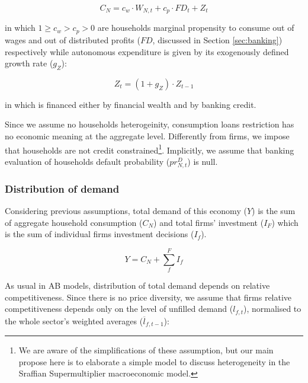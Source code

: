 \documentclass[12pt,openright,oneside,a4paper,english,sumario=tradicional]{gpsabntex}
\numberwithin{listing}{chapter}
\begin{document}
\begin{latex}
\begin{equation}
C_{N} = c_{w}\cdot W_{N,t} + c_{p}\cdot FD_{t} + Z_{t}
\end{equation}
\end{latex}
in which \(1 \geq c_{w} > c_{p} > 0\) are households marginal propensity to consume out of wages and out of distributed profits (\(FD\), discussed in Section \ref{sec:banking}) respectively while autonomous expenditure is given by its exogenously defined growth rate (\(g_{Z}\)):
\begin{latex}
\begin{equation}
Z_{t} = (1+g_{Z})\cdot Z_{t-1}
\end{equation}
\end{latex}
in which is financed either by financial wealth and by banking credit.

Since we assume no households heterogeinity, consumption loans restriction has no economic meaning at the aggregate level.
Differently from firms, we impose that households are not credit constrained\footnote{We are aware of the simplifications of these assumption, but our main propose here is to elaborate a simple model to discuss heterogeneity in the Sraffian Supermultiplier macroeconomic model.}.
Implicitly, we assume that banking evaluation of households default probability (\(pr^{D}_{N,t}\)) is null.

\subsubsection{Distribution of demand}
\label{sec:org506a775}


Considering previous assumptions, total demand of this economy (\(Y\)) is the sum of aggregate household consumption (\(C_{N}\)) and total firms' investment (\(I_{F}\)) which is the sum of individual firms investment decisions (\(I_{f}\)).
\begin{latex}
\begin{equation}
\label{Ch_super_EQ_GDP_D}
Y = C_{N} + \sum_{f}^{F} I_{f}
\end{equation}
\end{latex}
As usual in AB models, distribution of total demand depends on relative competitiveness.
Since there is no price diversity, we assume that firms relative competitiveness depends only on the level of unfilled demand (\(l_{f,t}\)), normalised to the whole sector’s weighted averages (\(\overline{l}_{f,t-1}\)):
\end{document}
